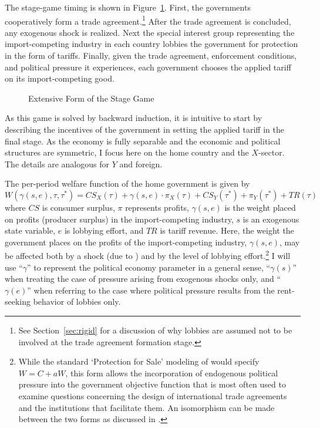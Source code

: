 \documentclass[12pt]{article}
\newcommand{\ga}{\gamma}
\begin{document}
The stage-game timing is shown in Figure~\ref{fig:ext}. First, the governments cooperatively form a trade agreement.\footnote{See Section~\ref{sec:rigid} for a discussion of why lobbies are assumed not to be involved at the trade agreement formation stage.} After the trade agreement is concluded, any exogenous shock is realized. Next the special interest group representing the import-competing industry in each country lobbies the government for protection in the form of tariffs. Finally, given the trade agreement, enforcement conditions, and political pressure it experiences, each government chooses the applied tariff on its import-competing good.

\begin{figure}
	\begin{center}
		
	\end{center}
	\caption{Extensive Form of the Stage Game\label{fig:ext}}
\end{figure}


As this game is solved by backward induction, it is intuitive to start by describing the incentives of the government in setting the applied tariff in the final stage. As the economy is fully separable and the economic and political structures are symmetric, I focus here on the home country and the $X$-sector. The details are analogous for $Y$ and foreign.

The per-period welfare function of the home government is given by
\begin{equation}
  W(\ga(s,e),\tau,\tau^*) = \mathit{CS}_X(\tau) + \ga(s,e) \cdot \pi_X(\tau) + \mathit{CS}_Y(\tau^*) + \pi_Y(\tau^*) + \mathit{TR}(\tau)
  \label{eq:wel}
\end{equation}
where $\mathit{CS}$ is consumer surplus, $\pi$ represents profits, $\ga(s,e)$ is the weight placed on profits (producer surplus) in the import-competing industry, $s$ is an exogenous state variable, $e$ is lobbying effort, and $\mathit{TR}$ is tariff revenue. Here, the weight the government places on the profits of the import-competing industry, $\ga(s,e)$, may be affected both by a shock (due to \Textcite{ms2011}) and by the level of lobbying effort.\footnote{While the standard `Protection for Sale' modeling of \Textcite{gh94} would specify $W = C + aW$, this form allows the incorporation of endogenous political pressure into the government objective function that is most often used to examine questions concerning the design of international trade agreements and the institutions that facilitate them. An isomorphism can be made between the two forms as discussed in \Textcite{buzard2013b}.} I will use ``$\ga$'' to represent the political economy parameter in a general sense, ``$\ga(s)$'' when treating the case of pressure arising from exogenous shocks only, and ``$\ga(e)$'' when referring to the case where political pressure  results from the rent-seeking behavior of lobbies only.
\end{document}
